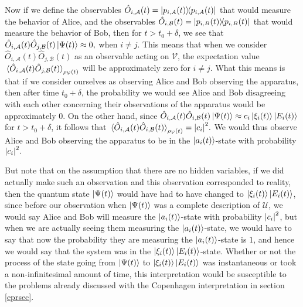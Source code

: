     Now if we define the observables $\hat{O}_{i,\mathcal{A}}(t)=\dyad{p_{i,A}(t)}$ that %
%
    would measure the behavior of Alice, and the observables $\hat{O}_{i,\mathcal{B}}(t)=\dyad{p_{i,B}(t)}$ that would measure the behavior of Bob, then for $t>t_0+\delta$, we see that $\hat{O}_{i,\mathcal{A}}(t)\hat{O}_{j,\mathcal{B}}(t)\ket{\Psi(t)}\approx 0,$ when $i\neq j$. This means that when we consider $\hat{O}_{i,\mathcal{A}}(t)\hat{O}_{j,\mathcal{B}}(t)$ as an observable acting on $\mathcal{V}$,  the expectation value $\ev*{\hat{O}_{i,\mathcal{A}}(t)\hat{O}_{j,\mathcal{B}}(t)}_{\rho_\mathcal{V}(t)}$ will be approximately zero for $i\neq j$. What this means is that if we consider ourselves as observing Alice and Bob observing the apparatus, then after time $t_0+\delta$, the probability we would see Alice and Bob disagreeing with each other concerning their observations of the apparatus would be approximately 0. 
     On the other hand, since $\hat{O}_{i,\mathcal{A}}(t)\hat{O}_{i,\mathcal{B}}(t)\ket{\Psi(t)} \approx c_i \ket{\xi_i(t)}\ket{E_i(t)}$ for $t>t_0+\delta$, it follows that $\ev*{\hat{O}_{i,\mathcal{A}}(t)\hat{O}_{i,\mathcal{B}}(t)}_{\rho_\mathcal{V}(t)}=\abs{c_i}^2.$ 
     We would thus observe Alice and Bob observing the apparatus to be in the $\ket{a_i(t)}$-state with probability $\abs{c_i}^2.$ 
     
     But note that on the assumption that there are no hidden variables, if we did actually make such an observation and this observation corresponded to reality, then the quantum state $\ket{\Psi(t)}$ would have had to have changed to $\ket{\xi_i(t)}\ket{E_i(t)}$, since before our observation when $\ket{\Psi(t)}$ was a complete description of $\mathcal{U}$, we would say Alice and Bob will measure the $\ket{a_i(t)}$-state with probability $\abs{c_i}^2$, but when we are actually seeing them measuring the $\ket{a_i(t)}$-state, we would have to say that now the probability they are measuring the $\ket{a_i(t)}$-state is $1$, and hence we would say that the system was in the $\ket{\xi_i(t)}\ket{E_i(t)}$-state. Whether or not the process of the state going from $\ket{\Psi(t)}$ to $\ket{\xi_i(t)}\ket{E_i(t)}$ was instantaneous or took a non-infinitesimal amount of time, this interpretation would be susceptible to the problems already discussed with the Copenhagen interpretation in section \ref{eprsec}.
    
